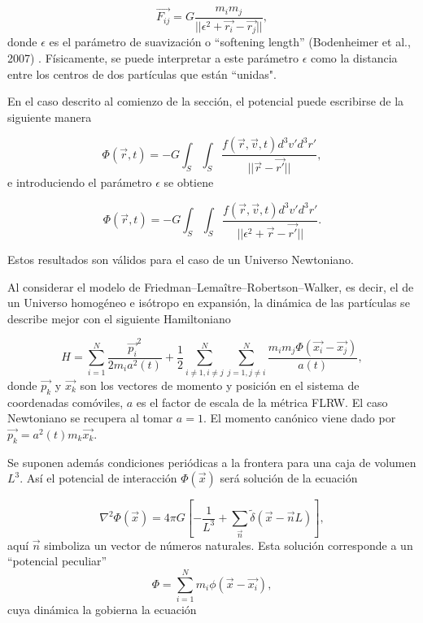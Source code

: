 \documentclass[a4paper,openright,12pt]{book}
\begin{document}
\begin{equation}
 \vec{F_{ij}}
  = G\frac{m_{i}m_{j}}{||\epsilon^{2} + \vec{r_{i}}-\vec{r_{j}}||},\label{eqn2.7}
\end{equation} 
donde $\epsilon$ es el parámetro de suavización o “softening length” (Bodenheimer et al., 2007) \cite{b5}. Físicamente, se puede interpretar a este parámetro $\epsilon$ como la distancia entre los centros de dos partículas que están “unidas".

En el caso descrito al comienzo de la sección, el potencial puede escribirse de la siguiente manera

\begin{equation}
  \Phi(\vec{r},t)
  = -G
  \int_{S}\int_{S}
  \frac{f(\vec{r}, \vec{v}, t)d^{3}v'd^{3}r'}{||\vec{r}-\vec{r'}||},\label{eqn2.8}
\end{equation}
e introduciendo el parámetro $\epsilon$ se obtiene

\begin{equation}
 \Phi(\vec{r},t)
  = -G
  \int_{S}\int_{S}
  \frac{f(\vec{r}, \vec{v}, t)d^{3}v'd^{3}r'}{||\epsilon^{2} + \vec{r}-\vec{r'}||}.\label{eqn2.9}
\end{equation}

Estos resultados son válidos para el caso de un Universo Newtoniano.

Al considerar el modelo de Friedman--Lemaître--Robertson--Walker, es decir, el de un Universo homogéneo e isótropo en expansión, la dinámica de las partículas se describe mejor con el siguiente Hamiltoniano

\begin{equation}
  H 
  = \sum_{i=1}^{N} \frac{\vec{p_{i}}^{2}}{2 m_{i} a^{2}(t)} 
  +
  \frac{1}{2} \sum_{i\not=1,i\not=j}^{N}\sum_{j=1,j\not=i}^{N}
  \frac{m_{i}m_{j}\Phi(\vec{x_{i}}-\vec{x_{j}})}{a(t)},\label{eqn2.10}
\end{equation}
donde $\vec{p_{k}}$ y $\vec{x_{k}}$ son los vectores de momento y posición en el sistema de coordenadas comóviles, $a$ es el factor de escala de la métrica FLRW. El caso Newtoniano se recupera al tomar $a = 1$. El momento canónico viene dado por $\vec{p_{k}} = a^{2}(t)m_{k}\vec{x_{k}}$.

Se suponen además condiciones periódicas a la frontera para una caja de volumen $L^{3}$. Así el potencial de interacción $\Phi(\vec{x})$ será solución de la ecuación

\begin{equation}
 \nabla^{2}\Phi(\vec{x})
 =
 4\pi G
 \left[
 -\frac{1}{L^{3}}
 +
 \sum_{\vec{n}} \tilde{\delta}(\vec{x}-\vec{n}L)
 \right],\label{eqn2.11}
\end{equation}
aquí $\vec{n}$ simboliza un vector de números naturales. Esta solución corresponde a un “potencial peculiar”
\begin{equation}
 \Phi
 =
 \sum_{i=1}^{N} m_{i} \phi(\vec{x}-\vec{x_{i}}),\label{eqn2.12}
\end{equation}
cuya dinámica la gobierna la ecuación
\end{document}

